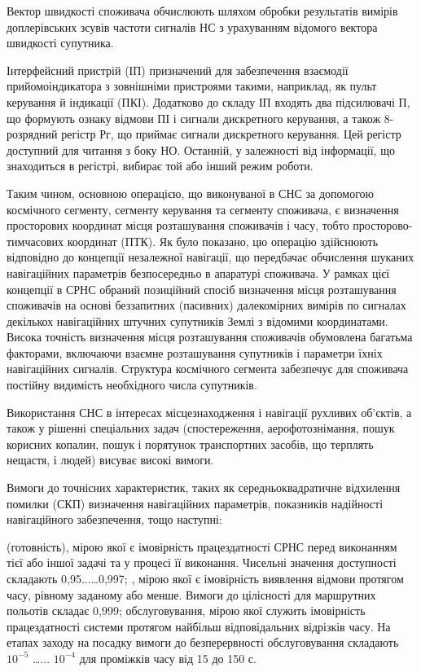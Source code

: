 Вектор швидкості споживача обчислюють шляхом обробки результатів вимірів доплерівських зсувів 
частоти сигналів НС з урахуванням відомого вектора швидкості супутника. 

Інтерфейсний пристрій (ІП) призначений для забезпечення взаємодії прийомоіндикатора з зовнішніми 
пристроями такими, наприклад, як пульт керування й індикації (ПКІ). Додатково до складу ІП входять 
два підсилювачі П, що формують ознаку відмови ПІ і сигнали дискретного керування, а також 8-розрядний 
регістр Рг, що приймає сигнали дискретного керування. Цей регістр доступний для читання з боку НО. 
Останній, у залежності від інформації, що знаходиться в регістрі, вибирає той або інший режим роботи.

Таким чином, основною операцією, що виконуваної в СНС за допомогою космічного сегменту, сегменту 
керування та сегменту споживача, є визначення просторових координат місця розташування споживачів і 
часу, тобто просторово-тимчасових координат (ПТК). Як було показано, цю операцію здійснюють відповідно 
до концепції незалежної навігації, що передбачає обчислення шуканих навігаційних параметрів 
безпосередньо в апаратурі споживача. У рамках цієї концепції в СРНС обраний позиційний спосіб 
визначення місця розташування споживачів на основі беззапитних (пасивних) далекомірних вимірів по 
сигналах декількох навігаційних штучних супутників Землі з відомими координатами. Висока точність 
визначення місця розташування споживачів обумовлена багатьма факторами, включаючи взаємне розташування 
супутників і параметри їхніх навігаційних сигналів. Структура космічного сегмента забезпечує для 
споживача постійну видимість необхідного числа супутників.

Використання СНС в інтересах місцезнаходження і навігації рухливих об'єктів, а також у рішенні 
спеціальних задач (спостереження, аерофотознімання, пошук корисних копалин, пошук і порятунок 
транспортних засобів, що терплять нещастя, і людей) висуває високі вимоги.

Вимоги до точнісних характеристик, таких як середньоквадратичне відхилення помилки (СКП) визначення 
навігаційних параметрів, показників надійності навігаційного забезпечення, тощо наступні:
\begin{itemize}
   (готовність),  мірою якої є імовірність працездатності СРНС перед виконанням 
тієї або іншої задачі та у процесі її виконання. Чисельні значення доступності складають 0,95...\dots 0,997;
 , мірою якої є імовірність виявлення відмови протягом часу, рівному заданому 
або менше. Вимоги до цілісності для маршрутних польотів складає 0,999;
  обслуговування, мірою якої служить імовірність працездатності системи 
протягом найбільш відповідальних відрізків часу. На етапах заходу на посадку вимоги до безперервності 
обслуговування складають $10^{-5}$ \dots ... $10^{-4}$ для проміжків часу від 15 до 150 с.
\end{itemize}

